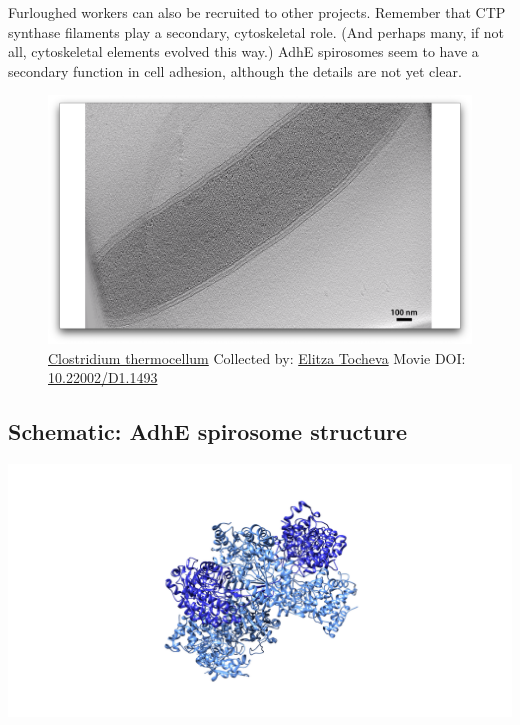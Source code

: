\documentclass[]{tufte-book}
\begin{document}
Furloughed workers can also be recruited to other projects. Remember
that CTP synthase filaments play a secondary, cytoskeletal role. (And
perhaps many, if not all, cytoskeletal elements evolved this way.) AdhE
spirosomes seem to have a secondary function in cell adhesion, although
the details are not yet clear.





\begin{figure}
\includegraphics{movie_stills/4_5} \caption[\protect\hyperlink{tree}{Clostridium thermocellum} Collected
by: \protect\hyperlink{elitza_tocheva}{Elitza Tocheva} Movie DOI:
\href{https://doi.org/10.22002/D1.1493}{10.22002/D1.1493}]{\protect\hyperlink{tree}{Clostridium thermocellum} Collected
by: \protect\hyperlink{elitza_tocheva}{Elitza Tocheva} Movie DOI:
\href{https://doi.org/10.22002/D1.1493}{10.22002/D1.1493}}\label{fig:4-5}
\end{figure}

\hypertarget{AdhE_spirosome_structure}{\subsection*{Schematic: AdhE
spirosome structure}\label{AdhE_spirosome_structure}}

\includegraphics{img/schematics/4_5_1}
\end{document}

